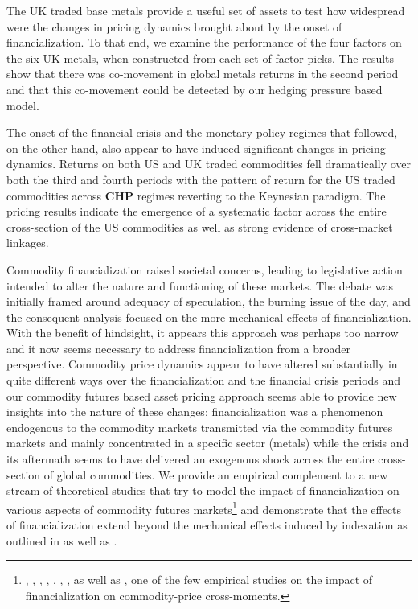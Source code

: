 \documentclass[12pt,]{article}
\let\rmarkdownfootnote\footnote%
\def\footnote{\protect\rmarkdownfootnote}
\begin{document}
The UK traded base metals provide a useful set of assets to test how
widespread were the changes in pricing dynamics brought about by the
onset of financialization. To that end, we examine the performance of
the four factors on the six UK metals, when constructed from each set of
factor picks. The results show that there was co-movement in global
metals returns in the second period and that this co-movement could be
detected by our hedging pressure based model.

The onset of the financial crisis and the monetary policy regimes that
followed, on the other hand, also appear to have induced significant
changes in pricing dynamics. Returns on both US and UK traded
commodities fell dramatically over both the third and fourth periods
with the pattern of return for the US traded commodities across
\textbf{CHP} regimes reverting to the Keynesian paradigm. The pricing
results indicate the emergence of a systematic factor across the entire
cross-section of the US commodities as well as strong evidence of
cross-market linkages.

Commodity financialization raised societal concerns, leading to
legislative action intended to alter the nature and functioning of these
markets. The debate was initially framed around adequacy of speculation,
the burning issue of the day, and the consequent analysis focused on the
more mechanical effects of financialization. With the benefit of
hindsight, it appears this approach was perhaps too narrow and it now
seems necessary to address financialization from a broader perspective.
Commodity price dynamics appear to have altered substantially in quite
different ways over the financialization and the financial crisis
periods and our commodity futures based asset pricing approach seems
able to provide new insights into the nature of these changes:
financialization was a phenomenon endogenous to the commodity markets
transmitted via the commodity futures markets and mainly concentrated in
a specific sector (metals) while the crisis and its aftermath seems to
have delivered an exogenous shock across the entire cross-section of
global commodities. We provide an empirical complement to a new stream
of theoretical studies that try to model the impact of financialization
on various aspects of commodity futures markets\footnote{\citet{etula_broker-dealer_2013},
  \citet{acharya_limits_2013}, \citet{cheng_convective_2014},
  \citet{leclercq_equilibrium_2014}, \citet{sockin_informational_2015},
  \citet{goldstein_speculation_2014},
  \citet{EkelandSpeculationcommodityfutures2016},
  \citet{goldstein_commodity_2017} as well as \citet{le_futures_2017},
  one of the few empirical studies on the impact of financialization on
  commodity-price cross-moments.} and demonstrate that the effects of
financialization extend beyond the mechanical effects induced by
indexation as outlined in \citet{basak_model_2016} as well as
\citet{tang_index_2012}.
\end{document}
